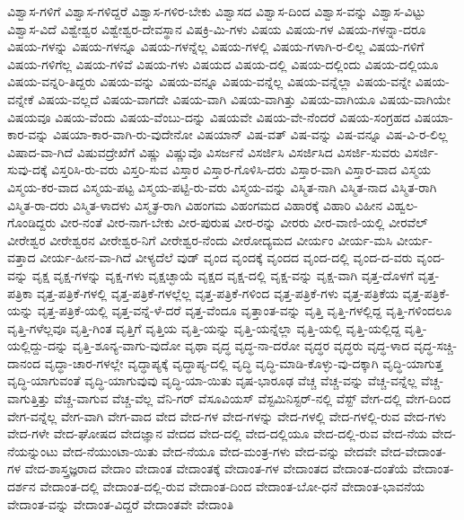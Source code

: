 {ವಿಶ್ವಾಸ-ಗಳಿಗೆ
ವಿಶ್ವಾಸ-ಗಳಿದ್ದರೆ
ವಿಶ್ವಾಸ-ಗಳಿರ-ಬೇಕು
ವಿಶ್ವಾಸದ
ವಿಶ್ವಾಸ-ದಿಂದ
ವಿಶ್ವಾಸ-ವನ್ನು
ವಿಶ್ವಾಸ-ವಿಟ್ಟು
ವಿಶ್ವಾಸ-ವಿದೆ
ವಿಶ್ವೇಶ್ವರ
ವಿಶ್ವೇಶ್ವರ-ದೇವಸ್ಥಾನ
ವಿಷಕ್ರಿ-ಮಿ-ಗಳು
ವಿಷಯ
ವಿಷಯ-ಗಳ
ವಿಷಯ-ಗಳನ್ನಾ-ದರೂ
ವಿಷಯ-ಗಳನ್ನು
ವಿಷಯ-ಗಳನ್ನೂ
ವಿಷಯ-ಗಳನ್ನೆಲ್ಲ
ವಿಷಯ-ಗಳಲ್ಲಿ
ವಿಷಯ-ಗಳಾಗಿ-ರ-ಲಿಲ್ಲ
ವಿಷಯ-ಗಳಿಗೆ
ವಿಷಯ-ಗಳಿಗೆಲ್ಲ
ವಿಷಯ-ಗಳಿವೆ
ವಿಷಯ-ಗಳು
ವಿಷಯದ
ವಿಷಯ-ದಲ್ಲಿ
ವಿಷಯ-ದಲ್ಲಿಂದು
ವಿಷಯ-ದಲ್ಲಿಯೂ
ವಿಷಯ-ವನ್ನರಿ-ತಿದ್ದರು
ವಿಷಯ-ವನ್ನು
ವಿಷಯ-ವನ್ನೂ
ವಿಷಯ-ವನ್ನೆಲ್ಲ
ವಿಷಯ-ವನ್ನೆಲ್ಲಾ
ವಿಷಯ-ವನ್ನೇ
ವಿಷಯ-ವನ್ನೇಕೆ
ವಿಷಯ-ವಲ್ಲದೆ
ವಿಷಯ-ವಾಗದೇ
ವಿಷಯ-ವಾಗಿ
ವಿಷಯ-ವಾಗಿತ್ತು
ವಿಷಯ-ವಾಗಿಯೂ
ವಿಷಯ-ವಾಗಿಯೇ
ವಿಷಯವೂ
ವಿಷಯ-ವೆಂದು
ವಿಷಯ-ವೆಂಬು-ದನ್ನು
ವಿಷಯವೇ
ವಿಷಯ-ವೇ-ನೆಂದರೆ
ವಿಷಯ-ಸಂಗ್ರಹದ
ವಿಷಯಾ-ಕಾರ-ವನ್ನು
ವಿಷಯಾ-ಕಾರ-ವಾಗಿ-ರು-ವುದೇನೋ
ವಿಷಯಾನ್
ವಿಷ-ವತ್
ವಿಷ-ವನ್ನು
ವಿಷ-ವನ್ನೂ
ವಿಷ-ವಿ-ರ-ಲಿಲ್ಲ
ವಿಷಾದ-ವಾ-ಗಿದೆ
ವಿಷುವದ್ರೇಖೆಗೆ
ವಿಷ್ಣು
ವಿಷ್ಣುವೊ
ವಿಸರ್ಜನೆ
ವಿಸರ್ಜಿಸಿ
ವಿಸರ್ಜಿಸಿದ
ವಿಸರ್ಜಿ-ಸುವರು
ವಿಸರ್ಜಿ-ಸುವು-ದಕ್ಕೆ
ವಿಸ್ತರಿಸಿ-ರು-ವರು
ವಿಸ್ತರಿ-ಸುವ
ವಿಸ್ತಾರ
ವಿಸ್ತಾರ-ಗೊಳಿಸಿ-ದರು
ವಿಸ್ತಾರ-ವಾಗಿ
ವಿಸ್ತಾರ-ವಾದ
ವಿಸ್ಮಯ
ವಿಸ್ಮಯ-ಕರ-ವಾದ
ವಿಸ್ಮಯ-ಪಟ್ಟ
ವಿಸ್ಮಯ-ಪಟ್ಟಿ-ರು-ವರು
ವಿಸ್ಮಯ-ವನ್ನು
ವಿಸ್ಮಿತ-ನಾಗಿ
ವಿಸ್ಮಿತ-ನಾದ
ವಿಸ್ಮಿತ-ರಾಗಿ
ವಿಸ್ಮಿತ-ರಾ-ದರು
ವಿಸ್ಮಿತ-ಳಾದಳು
ವಿಸ್ಮೃತ-ರಾಗಿ
ವಿಹಂಗಮ
ವಿಹಂಗಮದ
ವಿಹಾರಕ್ಕೆ
ವಿಹಾರಿ
ವಿಹೀನ
ವಿಹ್ವಲ-ಗೊಂಡಿದ್ದರು
ವೀರ-ನಂತೆ
ವೀರ-ನಾಗ-ಬೇಕು
ವೀರ-ಪುರುಷ
ವೀರ-ರನ್ನು
ವೀರರು
ವೀರ-ವಾಣಿ-ಯಲ್ಲಿ
ವೀರವೆಲ್
ವೀರೇಶ್ವರ
ವೀರೇಶ್ವರನ
ವೀರೇಶ್ವರ-ನಿಗೆ
ವೀರೇಶ್ವರ-ನೆಂದು
ವೀರೋದ್ಯಮದ
ವೀರ್ಯಂ
ವೀರ್ಯ-ಮಸಿ
ವೀರ್ಯ-ವತ್ತಾದ
ವೀರ್ಯ-ಹೀನ-ವಾ-ಗಿದೆ
ವೀಳ್ಯದೆಲೆ
ವುಡ್
ವೃಂದ
ವೃಂದಕ್ಕೆ
ವೃಂದದ
ವೃಂದ-ದಲ್ಲಿ
ವೃಂದ-ದ-ವರು
ವೃಂದ-ವನ್ನು
ವೃಕ್ಷ
ವೃಕ್ಷ-ಗಳನ್ನು
ವೃಕ್ಷ-ಗಳು
ವೃಕ್ಷಚ್ಛಾಯೆ
ವೃಕ್ಷದ
ವೃಕ್ಷ-ದಲ್ಲಿ
ವೃಕ್ಷ-ವನ್ನು
ವೃಕ್ಷ-ವಾಗಿ
ವೃತ್ತ-ದೊಳಗೆ
ವೃತ್ತ-ಪತ್ರಿಕಾ
ವೃತ್ತ-ಪತ್ರಿಕೆ-ಗಳಲ್ಲಿ
ವೃತ್ತ-ಪತ್ರಿಕೆ-ಗಳಲ್ಲೆಲ್ಲ
ವೃತ್ತ-ಪತ್ರಿಕೆ-ಗಳಿಂದ
ವೃತ್ತ-ಪತ್ರಿಕೆ-ಗಳು
ವೃತ್ತ-ಪತ್ರಿಕೆಯ
ವೃತ್ತ-ಪತ್ರಿಕೆ-ಯನ್ನು
ವೃತ್ತ-ಪತ್ರಿಕೆ-ಯಲ್ಲಿ
ವೃತ್ತ-ವನ್ನೆ-ಳೆ-ದರೆ
ವೃತ್ತ-ವೆಂದೂ
ವೃತ್ತಾಂತ-ವನ್ನು
ವೃತ್ತಿ
ವೃತ್ತಿ-ಗಳಲ್ಲಿದ್ದ
ವೃತ್ತಿ-ಗಳಿಂದಲೂ
ವೃತ್ತಿ-ಗಳೆಲ್ಲವೂ
ವೃತ್ತಿ-ಗಿಂತ
ವೃತ್ತಿಗೆ
ವೃತ್ತಿಯ
ವೃತ್ತಿ-ಯನ್ನು
ವೃತ್ತಿ-ಯನ್ನೆಲ್ಲಾ
ವೃತ್ತಿ-ಯಲ್ಲಿ
ವೃತ್ತಿ-ಯಲ್ಲಿದ್ದ
ವೃತ್ತಿ-ಯಲ್ಲಿದ್ದು-ದನ್ನು
ವೃತ್ತಿ-ಶೂನ್ಯ-ವಾಗು-ವುದೋ
ವೃಥಾ
ವೃದ್ಧ
ವೃದ್ಧ-ನಾ-ದರೋ
ವೃದ್ಧರ
ವೃದ್ಧರು
ವೃದ್ಧ-ಳಾದ
ವೃದ್ಧ-ಸಚ್ಚಿ-ದಾನಂದ
ವೃದ್ಧಾ-ಚಾರ-ಗಳಲ್ಲೇ
ವೃದ್ಧಾಪ್ಯಕ್ಕೆ
ವೃದ್ಧಾಪ್ಯ-ದಲ್ಲಿ
ವೃದ್ಧಿ
ವೃದ್ಧಿ-ಮಾಡಿ-ಕೊಳ್ಳು-ವು-ದಕ್ಕಾಗಿ
ವೃದ್ಧಿ-ಯಾಗುತ್ತ
ವೃದ್ಧಿ-ಯಾಗುವಂತೆ
ವೃದ್ಧಿ-ಯಾಗುವುವು
ವೃದ್ಧಿ-ಯಾ-ಯಿತು
ವೃಷ-ಭಾರೂಢ
ವೆಚ್ಚ
ವೆಚ್ಚ-ವನ್ನು
ವೆಚ್ಚ-ವನ್ನೆಲ್ಲ
ವೆಚ್ಚ-ವಾಗುತ್ತಿತ್ತು
ವೆಚ್ಚ-ವಾಗುವ
ವೆಚ್ಚ-ವೆಲ್ಲ
ವೆನಿ-ಗರ್
ವೆಸೂವಿಯಸ್
ವೆಸ್ಟಮಿನಿಸ್ಟರ್-ನಲ್ಲಿ
ವೆಸ್ಟ್
ವೇಗ-ದಲ್ಲಿ
ವೇಗ-ದಿಂದ
ವೇಗ-ವನ್ನೆಲ್ಲ
ವೇಗ-ವಾಗಿ
ವೇಗ-ವಾದ
ವೇದ
ವೇದ-ಗಳ
ವೇದ-ಗಳನ್ನು
ವೇದ-ಗಳಲ್ಲಿ
ವೇದ-ಗಳಲ್ಲಿ-ರುವ
ವೇದ-ಗಳು
ವೇದ-ಗಳೇ
ವೇದ-ಘೋಷದ
ವೇದಜ್ಞಾನ
ವೇದದ
ವೇದ-ದಲ್ಲಿ
ವೇದ-ದಲ್ಲಿಯೂ
ವೇದ-ದಲ್ಲಿ-ರುವ
ವೇದ-ನೆಯ
ವೇದ-ನೆಯನ್ನುಂಟು
ವೇದ-ನೆಯುಂಟಾ-ಯಿತು
ವೇದ-ನೆಯೂ
ವೇದ-ಮಂತ್ರ-ಗಳು
ವೇದ-ವನ್ನು
ವೇದವೇ
ವೇದ-ವೇದಾಂತ-ಗಳ
ವೇದ-ಶಾಸ್ತ್ರಜ್ಞರಾದ
ವೇದಾಂ
ವೇದಾಂತ
ವೇದಾಂತಕ್ಕೆ
ವೇದಾಂತ-ಗಳ
ವೇದಾಂತದ
ವೇದಾಂತ-ದಂತೆಯೆ
ವೇದಾಂತ-ದರ್ಶನ
ವೇದಾಂತ-ದಲ್ಲಿ
ವೇದಾಂತ-ದಲ್ಲಿ-ರುವ
ವೇದಾಂತ-ದಿಂದ
ವೇದಾಂತ-ಬೋ-ಧನೆ
ವೇದಾಂತ-ಭಾವನೆಯ
ವೇದಾಂತ-ವನ್ನು
ವೇದಾಂತ-ವಿದ್ದರೆ
ವೇದಾಂತವೇ
ವೇದಾಂತಿ
}
